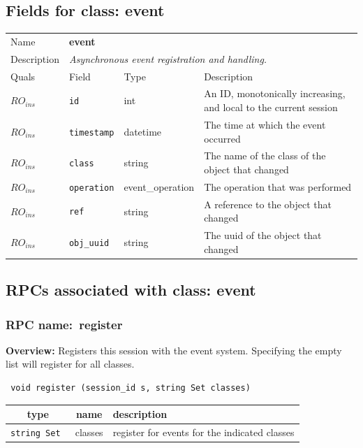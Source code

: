 \subsection{Fields for class: event}
\begin{longtable}{|lllp{}|}
\hline
\multicolumn{1}{|l}{Name} & \multicolumn{3}{l|}{\bf event} \\
\multicolumn{1}{|l}{Description} & \multicolumn{3}{l|}{\parbox{11cm}{\em
Asynchronous event registration and handling.}} \\
\hline
Quals & Field & Type & Description \\
\hline
$\mathit{RO}_\mathit{ins}$ &  {\tt id} & int & An ID, monotonically increasing, and local to the current session \\
$\mathit{RO}_\mathit{ins}$ &  {\tt timestamp} & datetime & The time at which the event occurred \\
$\mathit{RO}_\mathit{ins}$ &  {\tt class} & string & The name of the class of the object that changed \\
$\mathit{RO}_\mathit{ins}$ &  {\tt operation} & event\_operation & The operation that was performed \\
$\mathit{RO}_\mathit{ins}$ &  {\tt ref} & string & A reference to the object that changed \\
$\mathit{RO}_\mathit{ins}$ &  {\tt obj\_uuid} & string & The uuid of the object that changed \\
\hline
\end{longtable}
\subsection{RPCs associated with class: event}
\subsubsection{RPC name:~register}

{\bf Overview:} 
Registers this session with the event system.  Specifying the empty list
will register for all classes.

\begin{verbatim} void register (session_id s, string Set classes)\end{verbatim}



 
\vspace{0.3cm}
\begin{tabular}{|c|c|p{7cm}|}
 \hline
{\bf type} & {\bf name} & {\bf description} \\ \hline
{\tt string Set } & classes & register for events for the indicated classes \\ \hline 

\end{tabular}


